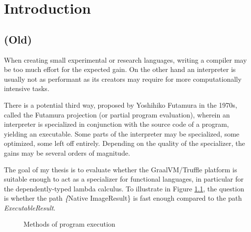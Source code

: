\documentclass[english,zadani,odsaz]{fitthesis}
\date{\today}
\title{}
\begin{document}
\maketitle
\setlength{\parskip}{0pt}
{\hypersetup{hidelinks}\tableofcontents}
\iftotalfigures\listoffigures\fi
\iftotaltables\listoftables\fi
\iftotallistings\listoflistings\fi
\iftwoside\cleardoublepage\fi
\setlength{\parskip}{0.5\bigskipamount}

\chapter{Introduction}
\label{sec:org778d43f}
\section{(Old)}
\label{sec:orga7f658f}
When creating small experimental or research languages, writing a compiler may
be too much effort for the expected gain. On the other hand an interpreter is
usually not as performant as its creators may require for more computationally
intensive tasks.

There is a potential third way, proposed by Yoshihiko Futamura in the 1970s,
called the Futamura projection (or partial program evaluation), wherein an
interpreter is specialized in conjunction with the source code of a program,
yielding an executable. Some parts of the interpreter may be specialized, some
optimized, some left off entirely. Depending on the quality of the specializer,
the gains may be several orders of magnitude.

The goal of my thesis is to evaluate whether the GraalVM/Truffle platform is
suitable enough to act as a specializer for functional languages, in particular
for the dependently-typed lambda calculus.  To illustrate in Figure
\ref{fig:futamora}, the question is whether the path \textit\{Native
Image\textrightarrow Result\} is fast enough compared to the path
\textit{Executable\textrightarrow Result}.

\begin{figure}
\centering
{}
\caption{Methods of program execution}
\label{fig:futamora}
\end{figure}
\end{document}
